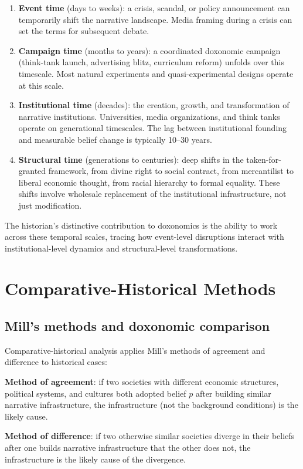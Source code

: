 \begin{enumerate}
  \item \textbf{Event time} (days to weeks): a crisis, scandal, or policy announcement can temporarily shift the narrative landscape.
  Media framing during a crisis can set the terms for subsequent debate.

  \item \textbf{Campaign time} (months to years): a coordinated doxonomic campaign (think-tank launch, advertising blitz, curriculum reform) unfolds over this timescale.
  Most natural experiments and quasi-experimental designs operate at this scale.

  \item \textbf{Institutional time} (decades): the creation, growth, and transformation of narrative institutions.
  Universities, media organizations, and think tanks operate on generational timescales.
  The lag between institutional founding and measurable belief change is typically 10--30 years.

  \item \textbf{Structural time} (generations to centuries): deep shifts in the taken-for-granted framework, from divine right to social contract, from mercantilist to liberal economic thought, from racial hierarchy to formal equality.
  These shifts involve wholesale replacement of the institutional infrastructure, not just modification.
\end{enumerate}

The historian's distinctive contribution to doxonomics is the ability to work across these temporal scales, tracing how event-level disruptions interact with institutional-level dynamics and structural-level transformations.

\section{Comparative-Historical Methods}
\label{sec:ch18-comparative}

\subsection{Mill's methods and doxonomic comparison}

Comparative-historical analysis applies Mill's methods of agreement and difference to historical cases:

\begin{definition}
\label{def:comparative}
\textbf{Method of agreement}: if two societies with different economic structures, political systems, and cultures both adopted belief $p$ after building similar narrative infrastructure, the infrastructure (not the background conditions) is the likely cause.

\textbf{Method of difference}: if two otherwise similar societies diverge in their beliefs after one builds narrative infrastructure that the other does not, the infrastructure is the likely cause of the divergence.
\end{definition}

